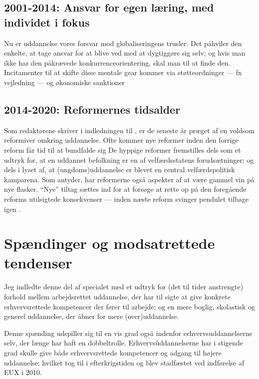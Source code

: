 \subsection{2001-2014: Ansvar for egen læring, med individet i fokus}

Nu er uddannelse vores forsvar mod globaliseringens trusler.
Det påhviler den enkelte, at tage ansvar for at blive ved med at dygtiggøre sig selv; og hvis man ikke har den påkrævede konkurrenceorientering, skal man til at finde den.
Incitamenter til at skifte disse mentale gear kommer via støtteordninger — fx vejledning — og økonomiske sanktioner

\subsection{2014-2020: Reformernes tidsalder}

Som redaktørene skriver i indledningen til , er de seneste år præget af en voldsom reformiver omkring uddannelse.
Ofte kommer nye reformer inden den forrige reform får tid til at bundfalde sig
De hyppige reformer fremstilles dels som et udtryk for, at en uddannet befolkning er en af velfærdsstatens forudsætninger; og dels i lyset af, at (ungdoms)uddannelse er blevet en central velfærdspolitisk kamparena.
Som \citeauthor{jorgensenReformenAfErhvervsuddannelserne2016} antyder, har reformerne også aspekter af at være gammel vin på nye flasker.
“Nye” tiltag sættes ind for at forsøge at rette op på den foregående reforms utilsigtede konsekvenser — inden næste reform svinger pendulet tilbage igen \autocite[s.9 ]{jorgensenReformenAfErhvervsuddannelserne2016}.

\section{Spændinger og modsatrettede tendenser}

Jeg indledte denne del af specialet med et udtryk for (det til tider anstrengte) forhold mellem arbejdsrettet uddannelse, der har til sigte at give konkrete erhvervsrettede kompetencer der fører til arbejde; og en mere boglig, skolastisk og generel uddannelse, der åbner for mere (over)uddannelse.

Denne spænding udspiller sig til en vis grad også indenfor erhvervsuddannelserne selv, der længe har haft en dobbeltrolle.
Erhvervs\~uddannelserne har i stigende grad skulle give både erhvervsrettede kompetencer og adgang til højere uddannelse; hvilket tog til i efterkrigstiden \autocite[s. 47ff]{bondergaardHistoricalEmergenceKey2014} og blev stadfæstet ved indførelse af EUX i 2010.


